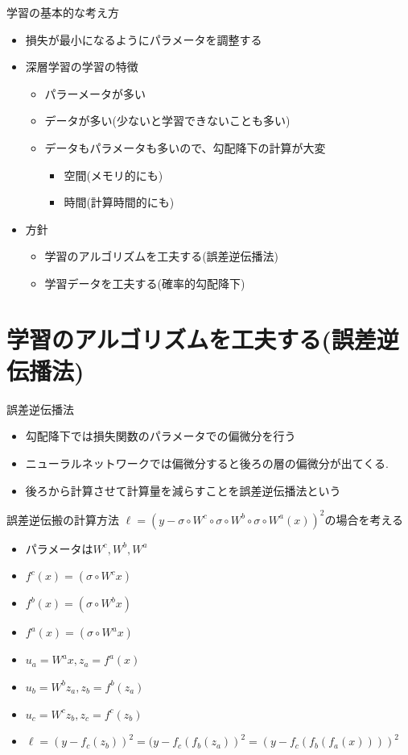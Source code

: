 \begin{frame}[fragile]{学習の基本的な考え方}
\begin{itemize}
\item 損失が最小になるようにパラメータを調整する
\item 深層学習の学習の特徴
  \begin{itemize}
  \item パラーメータが多い
  \item データが多い(少ないと学習できないことも多い)
  \item データもパラメータも多いので、勾配降下の計算が大変
    \begin{itemize}
    \item 空間(メモリ的にも)
    \item 時間(計算時間的にも)
    \end{itemize}
  \end{itemize}
\item 方針
  \begin{itemize}
  \item 学習のアルゴリズムを工夫する(誤差逆伝播法)
  \item 学習データを工夫する(確率的勾配降下)
  \end{itemize}
\end{itemize}

\section{学習のアルゴリズムを工夫する(誤差逆伝播法)}

\begin{frame}[fragile]{誤差逆伝播法}
\begin{itemize}
\item 勾配降下では損失関数のパラメータでの偏微分を行う
\item ニューラルネットワークでは偏微分すると後ろの層の偏微分が出てくる.
\item 後ろから計算させて計算量を減らすことを誤差逆伝播法という
\end{itemize}
\end{frame}


\begin{frame}[fragile]{誤差逆伝搬の計算方法}
$\ell = (y - \sigma \circ W^c \circ \sigma \circ W^{b} \circ \sigma \circ W^{a}(x))^2$の場合を考える
\begin{itemize}
  \item パラメータは$W^c, W^b, W^a$
  \item $f^c(x) = (\sigma \circ W^cx)$
  \item $f^b(x) = (\sigma \circ W^bx)$
  \item $f^a(x) = (\sigma \circ W^ax)$
  \item $u_a = W^ax, z_a = f^a(x)$
  \item $u_b = W^bz_a, z_b = f^b(z_a)$
  \item $u_c = W^cz_b, z_c = f^c(z_b)$
  \item $\ell = (y - f_c(z_b))^2 = (y - f_c(f_b(z_a))^2 = (y - f_c(f_b(f_a(x))))^2$
\end{itemize}
\end{frame}



\end{frame}
